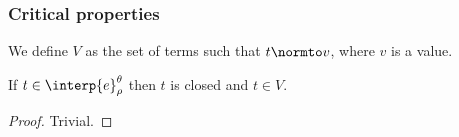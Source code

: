 

\subsubsection{Critical properties}
\label{subsec:critical_properties}

We define $V$ as the set of terms such that $t \normto v$, where $v$ is a value.
\ \\
\begin{lemma}[$\CRI$]
  \label{lemma:cri}
  If $t \in \interp{e}^\theta_\rho$ then $t$ is closed and $t \in V$.
\end{lemma}
\begin{proof}
  Trivial.
\end{proof}

